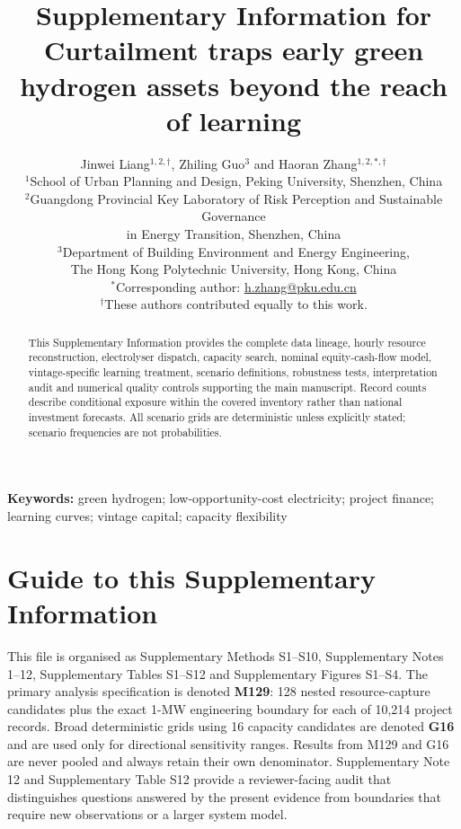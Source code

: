 \documentclass[11pt,a4paper]{article}
\begin{document}
\title{Supplementary Information for\\
Curtailment traps early green hydrogen assets beyond the reach of learning}
\author{Jinwei Liang$^{1,2,\dagger}$, Zhiling Guo$^{3}$ and Haoran Zhang$^{1,2,*,\dagger}$\\[0.65em]
\small $^{1}$School of Urban Planning and Design, Peking University, Shenzhen, China\\
\small $^{2}$Guangdong Provincial Key Laboratory of Risk Perception and Sustainable Governance\\
\small in Energy Transition, Shenzhen, China\\
\small $^{3}$Department of Building Environment and Energy Engineering,\\
\small The Hong Kong Polytechnic University, Hong Kong, China\\[0.45em]
\small $^{*}$Corresponding author: \href{mailto:h.zhang@pku.edu.cn}{h.zhang@pku.edu.cn}\\
\small $^{\dagger}$These authors contributed equally to this work.}
\date{}

\maketitle

\begin{abstract}
This Supplementary Information provides the complete data lineage, hourly resource reconstruction, electrolyser dispatch, capacity search, nominal equity-cash-flow model, vintage-specific learning treatment, scenario definitions, robustness tests, interpretation audit and numerical quality controls supporting the main manuscript. Record counts describe conditional exposure within the covered inventory rather than national investment forecasts. All scenario grids are deterministic unless explicitly stated; scenario frequencies are not probabilities.
\end{abstract}

\noindent\textbf{Keywords:} green hydrogen; low-opportunity-cost electricity; project finance; learning curves; vintage capital; capacity flexibility
\vspace{1em}

\section*{Guide to this Supplementary Information}

This file is organised as Supplementary Methods S1--S10, Supplementary Notes 1--12, Supplementary Tables S1--S12 and Supplementary Figures S1--S4. The primary analysis specification is denoted \textbf{M129}: 128 nested resource-capture candidates plus the exact 1-MW engineering boundary for each of 10,214 project records. Broad deterministic grids using 16 capacity candidates are denoted \textbf{G16} and are used only for directional sensitivity ranges. Results from M129 and G16 are never pooled and always retain their own denominator. Supplementary Note 12 and Supplementary Table S12 provide a reviewer-facing audit that distinguishes questions answered by the present evidence from boundaries that require new observations or a larger system model.
\end{document}
